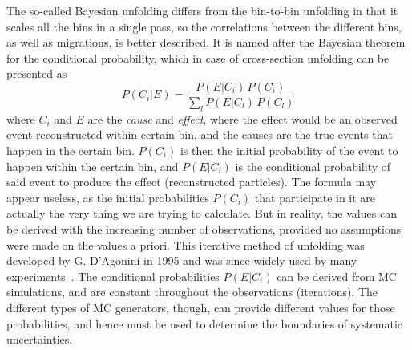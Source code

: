 The so-called Bayesian unfolding differs from the bin-to-bin unfolding in that it scales all the bins in a single pass, so the correlations between the different bins, as well as migrations, is better described. It is named after the Bayesian theorem for the conditional probability, which in case of cross-section unfolding can be presented as
\begin{equation}
P(C_i|E) = \frac{P(E|C_i) \, P(C_i)}{\sum\limits_l P(E|C_l) \, P(C_l)}
\end{equation}
where $C_i$ and $E$ are the {\itshape cause} and {\itshape effect}, where the effect would be an observed event reconstructed within certain bin, and the causes are the true events that happen in the certain bin. $P(C_i)$ is then the initial probability of the event to happen within the certain bin, and $P(E|C_i)$ is the conditional probability of said event to produce the effect (reconstructed particles). The formula may appear useless, as the initial probabilities $P(C_i)$ that participate in it are actually the very thing we are trying to calculate. But in reality, the values can be derived with the increasing number of observations, provided no assumptions were made on the values a priori. This iterative method of unfolding was developed by G. D'Agonini in 1995 and was since widely used by many experiments~\cite{lib:zcs_bayes}. The conditional probabilities $P(E|C_i)$ can be derived from MC simulations, and are constant throughout the observations (iterations). The different types of MC generators, though, can provide different values for those probabilities, and hence must be used to determine the boundaries of systematic uncertainties.

